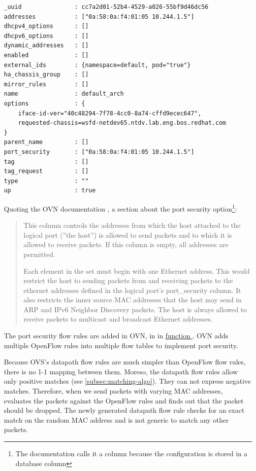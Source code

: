 \begin{verbatim}
_uuid               : cc7a2d01-52b4-4529-a026-55bf9d46dc56
addresses           : ["0a:58:0a:f4:01:05 10.244.1.5"]
dhcpv4_options      : []
dhcpv6_options      : []
dynamic_addresses   : []
enabled             : []
external_ids        : {namespace=default, pod="true"}
ha_chassis_group    : []
mirror_rules        : []
name                : default_arch
options             : {
    iface-id-ver="40c48294-7f78-4cc0-8a74-cffd9ecec647",
    requested-chassis=wsfd-netdev65.ntdv.lab.eng.bos.redhat.com
}
parent_name         : []
port_security       : ["0a:58:0a:f4:01:05 10.244.1.5"]
tag                 : []
tag_request         : []
type                : ""
up                  : true
\end{verbatim}

Quoting the OVN documentation \cite{OVNNBMan}, a section about the port security option\footnote{The documentation calls it a column because the configuration is stored in a database column}:

\begin{quote}
    This column controls the addresses from which the host
    attached to the logical port (''the host'') is allowed to
    send packets and to which it is allowed to receive
    packets. If this column is empty, all addresses are
    permitted.

    Each element in the set must begin with one Ethernet
    address. This would restrict the host to sending packets
    from and receiving packets to the ethernet addresses
    defined in the logical port's port\_security column. It
    also restricts the inner source MAC addresses that the
    host may send in ARP and IPv6 Neighbor Discovery packets.
    The host is always allowed to receive packets to multicast
    and broadcast Ethernet addresses.
\end{quote}

The port security flow rules are added in OVN, in  in \href{https://github.com/ovn-org/ovn/blob/45bf9ed9dd2070a458bf384ce529e9ef62f26bd5/controller/lflow.c\#L3091-L3093}{function }. OVN adds multiple OpenFlow rules into multiple flow tables to implement port security.

Because OVS's datapath flow rules are much simpler than OpenFlow flow rules, there is no 1-1 mapping between them. Moreso, the datapath flow rules allow only positive matches (see \cref{subsec:matching-algo}). They can not express negative matches. Therefore, when we send packets with varying MAC addresses,  evaluates the packets against the OpenFlow rules and finds out that the packet should be dropped. The newly generated datapath flow rule checks for an exact match on the random MAC address and is not generic to match any other packets.

